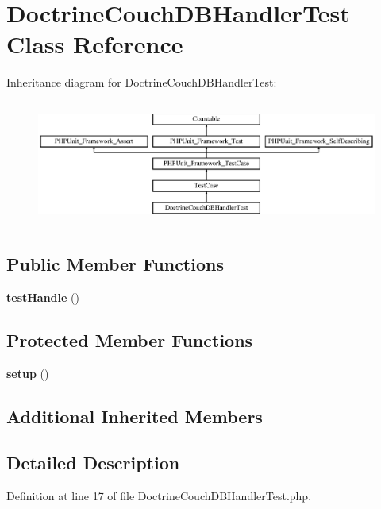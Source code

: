 \section{Doctrine\+Couch\+D\+B\+Handler\+Test Class Reference}
\label{class_monolog_1_1_handler_1_1_doctrine_couch_d_b_handler_test}
Inheritance diagram for Doctrine\+Couch\+D\+B\+Handler\+Test\+:\begin{figure}[H]
\begin{center}
\leavevmode
\includegraphics[height=4.129793cm]{class_monolog_1_1_handler_1_1_doctrine_couch_d_b_handler_test}
\end{center}
\end{figure}
\subsection*{Public Member Functions}
\begin{DoxyCompactItemize}
\item 
{\bf test\+Handle} ()
\end{DoxyCompactItemize}
\subsection*{Protected Member Functions}
\begin{DoxyCompactItemize}
\item 
{\bf setup} ()
\end{DoxyCompactItemize}
\subsection*{Additional Inherited Members}


\subsection{Detailed Description}


Definition at line 17 of file Doctrine\+Couch\+D\+B\+Handler\+Test.\+php.



